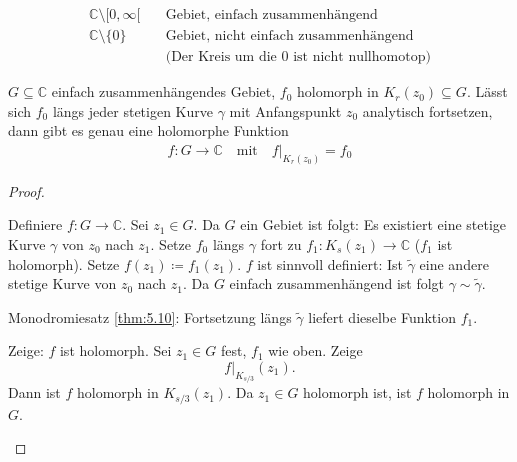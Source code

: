 \documentclass[a4paper,10pt]{scrbook}
\begin{document}
\begin{example*}
  \begin{align*}
    \mathbb{C} \setminus [0,\infty[ \quad &\text{Gebiet, einfach zusammenhängend}\\
    \mathbb{C} \setminus \{0\} \quad  & \text{Gebiet, nicht einfach zusammenhängend} \\
    & \text{(Der Kreis um die $0$ ist nicht nullhomotop)}
  \end{align*}
\end{example*}


\begin{notice}[Folgerung]
  $G \subseteq \mathbb{C}$ einfach zusammenhängendes Gebiet, $f_0$ holomorph in $K_r(z_0) \subseteq G$. Lässt sich $f_0$ längs jeder stetigen Kurve $\gamma$ mit Anfangspunkt $z_0$ analytisch fortsetzen, dann gibt es genau eine holomorphe Funktion
  \begin{align*}
    f : G \to \mathbb{C} \quad \text{mit} \quad f \Big|_{K_r(z_0)} = f_0
  \end{align*}
  \begin{proof}
    \begin{enum-arab}
      \item Definiere $f : G \to \mathbb{C}$. Sei $z_1 \in G$. Da $G$ ein Gebiet ist folgt: Es existiert eine stetige Kurve $\gamma$ von $z_0$ nach $z_1$. Setze $f_0$ längs $\gamma$ fort zu $f_1 : K_s(z_1) \to \mathbb{C}$ ($f_1$ ist holomorph). Setze $f(z_1) \coloneq f_1(z_1)$. $f$ ist sinnvoll definiert: Ist $\widetilde{\gamma}$ eine andere stetige Kurve von $z_0$ nach $z_1$. Da $G$ einfach zusammenhängend ist folgt $\gamma \sim \widetilde{\gamma}$.

      Monodromiesatz \ref{thm:5.10}: Fortsetzung längs $\widetilde{\gamma}$ liefert dieselbe Funktion $f_1$.

      \item Zeige: $f$ ist holomorph. Sei $z_1 \in G$ fest, $f_1$ wie oben. Zeige \[ f \Big|_{K_{s/3}}(z_1). \] Dann ist $f$ holomorph in $K_{s/3}(z_1)$. Da $z_1 \in G$ holomorph ist, ist $f$ holomorph in $G$.


\end{enum-arab}
\end{proof}
\end{notice}
\end{document}
